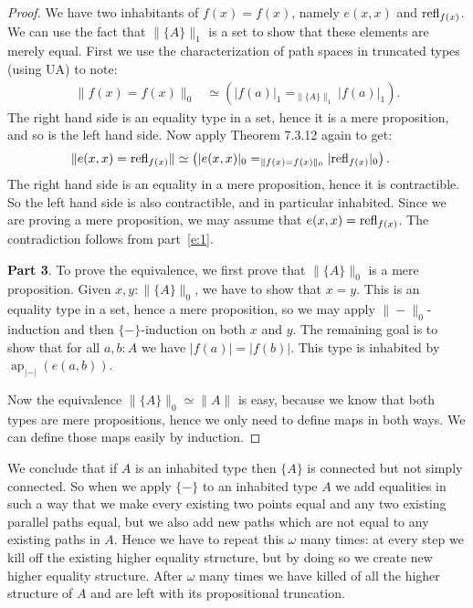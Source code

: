 \documentclass[square]{sigplanconf}
\DeclareMathOperator{\myap}{ap}
\newcommand{\refl}{\textnormal{refl}}
\newcommand{\ap}[2]{\ensuremath{\myap_{#1}(#2)}}
\theoremstyle{definition}
\theoremstyle{remark}
\begin{document}
\begin{proof}
  We have two inhabitants of $f(x)=f(x)$, namely $e(x,x)$ and $\refl_{f(x)}$. We can use the fact
  that $\|\{A\}\|_1$ is a set to show that these elements are merely equal. First we use the
  characterization of path spaces in truncated types~\cite[Theorem 7.3.12]{HoTTbook} (using UA) to
  note:
  \begin{align*}
    \|f(x)=f(x)\|_0&\simeq \left(|f(a)|_1 =_{\|\{A\}\|_1}|f(a)|_1\right).
  \end{align*}
  The right hand side is an equality type in a set, hence it is a mere proposition, and so is the
  left hand side. Now apply Theorem 7.3.12 again to get:
  \begin{align*}
    \|e(x,x)=\refl_{f(x)}\|&\simeq \left(|e(x,x)|_0=_{\|f(x)=f(x)\|_0}|\refl_{f(x)}|_0\right).
  \end{align*}
  The right hand side is an equality in a mere proposition, hence it is contractible. So the left
  hand side is also contractible, and in particular inhabited. Since we are proving a mere
  proposition, we may assume that $e(x,x)=\refl_{f(x)}$. The contradiction follows from
  part~\ref{e:1}.

  \textbf{Part 3}. To prove the equivalence, we first prove that $\|\{A\}\|_0$ is a mere
  proposition. Given $x, y : \|\{A\}\|_0$, we have to show that $x=y$. This is an equality type in a
  set, hence a mere proposition, so we may apply $\|{-}\|_0$-induction and then $\{{-}\}$-induction
  on both $x$ and $y$. The remaining goal is to show that for all $a, b : A$ we have
  $|f(a)|=|f(b)|$. This type is inhabited by $\ap{|{-}|}{e(a,b)}$.

  Now the equivalence $\|\{A\}\|_0\simeq \|A\|$ is easy, because we know that both types are mere
  propositions, hence we only need to define maps in both ways. We can define those maps easily by
  induction.
\end{proof}
We conclude that if $A$ is an inhabited type then $\{A\}$ is connected but not simply connected. So
when we apply $\{{-}\}$ to an inhabited type $A$ we add equalities in such a way that we make every
existing two points equal and any two existing parallel paths equal, but we also add new paths which
are not equal to any existing paths in $A$. Hence we have to repeat this $\omega$ many times: at
every step we kill off the existing higher equality structure, but by doing so we create new higher
equality structure. After $\omega$ many times we have killed of all the higher structure of $A$ and
are left with its propositional truncation.
\end{document}
